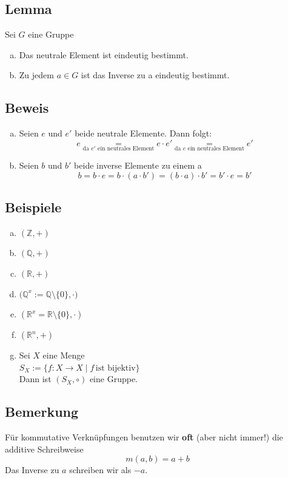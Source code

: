\subsection{Lemma}
Sei \(G\) eine Gruppe
\begin{enumerate}[a)]
\item Das neutrale Element ist eindeutig bestimmt.
\item Zu jedem \(a \in G\) ist das Inverse zu a eindeutig bestimmt.
\end{enumerate}

\subsection{Beweis}
\begin{enumerate}[a)]
\item Seien \(e\) und \(e'\) beide neutrale Elemente. Dann folgt:
\[
e \underset{\text{da \(e'\) ein neutrales Element}}{=} e \cdot e' \underset{\text{da \(e\) ein neutrales Element}}{=} e'
\]

\item Seien \(b\) und \(b'\) beide inverse Elemente zu einem a
\[
b=b \cdot e=b \cdot ( a \cdot b') = (b \cdot a) \cdot b' = b' \cdot e = b'
\] 
\end{enumerate}

\subsection{Beispiele}
\begin{enumerate}[a)]
\item \( ( \mathds{Z}, +) \)
\item \( (\mathds{Q}, + ) \)
\item \( (\mathds{R}, + ) \)
\item \( \big(\mathds{Q}^x := \mathds{Q} \setminus \{0\}, \cdot \big) \)
\item \( (\mathds{R}^x = \mathds{R} \setminus \{0\}, \cdot)\)
\item \( (\mathds{R}^n, +) \)
\item Sei \(X\) eine Menge \\
\(S_X := \Big\{f: X \rightarrow X \mid f \, \text{ist bijektiv}\Big\}\) \\
Dann ist \((S_X, \circ)\) eine Gruppe.
\end{enumerate}

\subsection{Bemerkung}
Für kommutative Verknüpfungen benutzen wir \textbf{oft} (aber nicht immer!) die additive Schreibweise
\[
m(a,b) = a+b
\]
Das Inverse zu \(a\) schreiben wir als \(-a\).

